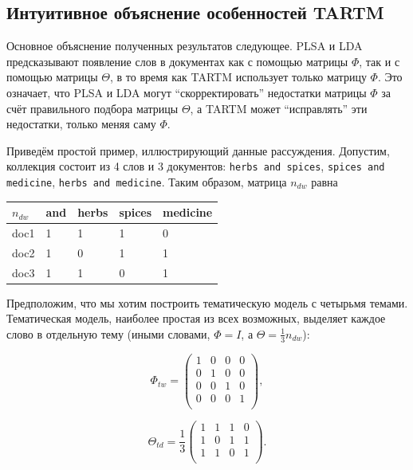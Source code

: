 \subsection{Интуитивное объяснение особенностей TARTM} 

Основное объяснение полученных результатов следующее. PLSA и LDA предсказывают появление слов в документах как с помощью матрицы $\Phi$, так и с помощью матрицы $\Theta$, в то время как TARTM использует только матрицу $\Phi$. Это означает, что PLSA и LDA могут ``скорректировать'' недостатки матрицы $\Phi$ за счёт правильного подбора матрицы $\Theta$, а TARTM может ``исправлять'' эти недостатки, только меняя саму $\Phi$.  

Приведём простой пример, иллюстрирующий данные рассуждения. Допустим, коллекция состоит из 4 слов и 3 документов: \texttt{herbs and spices}, \texttt{spices and medicine}, \texttt{herbs and medicine}. Таким образом, матрица $n_{dw}$ равна 

\begin{center} 
\begin{tabular}{l|llll} 
$n_{dw}$   & and & herbs & spices & medicine \\ \hline 
doc1       & 1   & 1     & 1      & 0        \\ 
doc2       & 1   & 0     & 1      & 1        \\ 
doc3       & 1   & 1     & 0      & 1        
\end{tabular} 
\end{center} 

Предположим, что мы хотим построить тематическую модель с четырьмя темами. Тематическая модель, наиболее простая из всех возможных, выделяет каждое слово в отдельную тему (иными словами, $\Phi = I$, а $\Theta = \frac{1}{3} n_{dw}$): 

\begin{minipage}[t]{0.25\textwidth} 
\[ 
\Phi_{tw} =  
\begin{pmatrix} 
    1 & 0 & 0 & 0 \\ 
    0 & 1 & 0 & 0 \\ 
    0 & 0 & 1 & 0 \\ 
    0 & 0 & 0 & 1 \\ 
\end{pmatrix}, 
\] 

\end{minipage}\begin{minipage}[t]{0.2\textwidth} 

\[ 
\Theta_{td} = \frac{1}{3}  
\begin{pmatrix} 
    1 & 1 & 1 & 0 \\ 
    1 & 0 & 1 & 1 \\ 
    1 & 1 & 0 & 1 \\ 
\end{pmatrix}. 
\] 

\end{minipage} 

